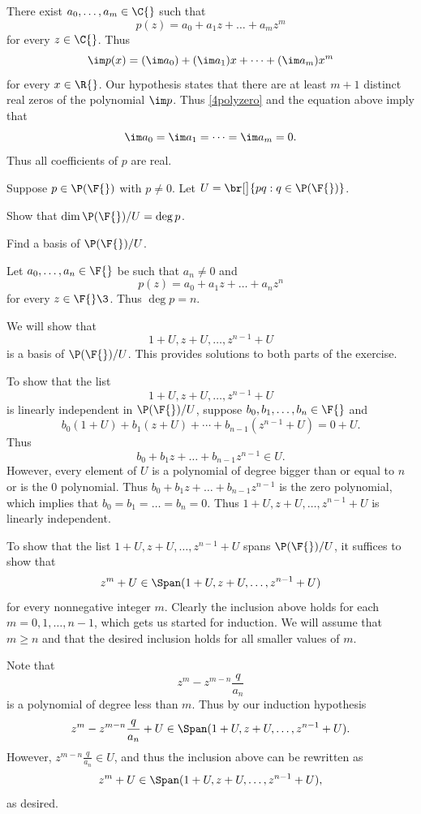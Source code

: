 \begin{Solution}
There exist $a_0, \dots, a_m \in \C{}$ such that
\[
p(z) = a_0 + a_1 z + \dots + a_m z^m
\]
for every $z \in \C{}$. Thus
\[
\im p(x) = (\im a_0) + (\im a_1)x + \dots + (\im a_m) x^m
\]
for every $x \in \R{}$. Our hypothesis states that there are at least $m+1$ distinct real zeros of the polynomial $\im p$. Thus \ref{4polyzero} and the equation above imply that
\[
\im a_0 = \im a_1 = \dots = \im a_m = 0.
\]
Thus all coefficients of $p$ are real.
\end{Solution}

\pagebreak[2]

\exercise
Suppose $p \in \P(\F{})$ with $p \ne 0$. Let $U = \br[\big]{p q : q \in \P(\F{})}$.
\begin{subtheorem}
\item
Show that $\dim \P(\F{})/U = \deg p$.
\item
Find a basis of $\P(\F{})/U$.
\end{subtheorem}
\exercisesubtheoremend

\begin{Solution}
Let $a_0, \dots, a_n \in \F{}$ be such that $a_n \ne 0$ and
\[
p(z) = a_0 + a_1 z + \dots + a_n z^n
\]
for every $z \in \F{}\3$. Thus $\deg p = n$.

We will show that
\[
1+ U, z + U, \dots, z^{n-1} + U
\]
is a basis of $\P(\F{})/U$. This provides solutions to both parts of the exercise.

To show that the list
\[
1+ U, z + U, \dots, z^{n-1} + U
\]
is linearly independent in $\P(\F{})/U$, suppose $b_0, b_1, \dots, b_n \in \F{}$ and
\[
b_0(1+ U) + b_1( z + U) + \cdots+ b_{n-1} (z^{n-1} + U) = 0 + U.
\]
Thus
\[
b_0 + b_1 z + \dots + b_{n-1} z^{n-1} \in U.
\]
However, every element of $U$ is a polynomial of degree bigger than or equal to $n$ or is the $0$ polynomial. Thus $b_0 + b_1 z + \dots + b_{n-1} z^{n-1}$ is the zero polynomial, which implies that
$b_0 = b_1 = \dots = b_n = 0$. Thus $1+ U, z + U, \dots, z^{n-1} + U$ is linearly independent.

To show that the list $1+ U, z + U, \dots, z^{n-1} + U$ spans $\P(\F{})/U$, it suffices to show that
\[
z^m + U \in \Span( 1+ U, z + U, \dots, z^{n-1} + U )
\]
for every nonnegative integer $m$. Clearly the inclusion above holds for each $m = 0, 1, \dots, n-1$, which gets us started for induction. We will assume that $m \ge n$ and that the desired inclusion holds for all smaller values of $m$.

Note that
\[
z^m - z^{m-n} \frac{q}{a_n}
\]
is a polynomial of degree less than $m$. Thus by our induction hypothesis
\[
z^m - z^{m-n} \frac{q}{a_n} + U \in \Span( 1+ U, z + U, \dots, z^{n-1} + U ).
\]
However, $z^{m-n} \frac{q}{a_n} \in U$, and thus the inclusion above can be rewritten as
\[
z^m  + U \in \Span( 1+ U, z + U, \dots, z^{n-1} + U ),
\]
as desired.
\end{Solution}

